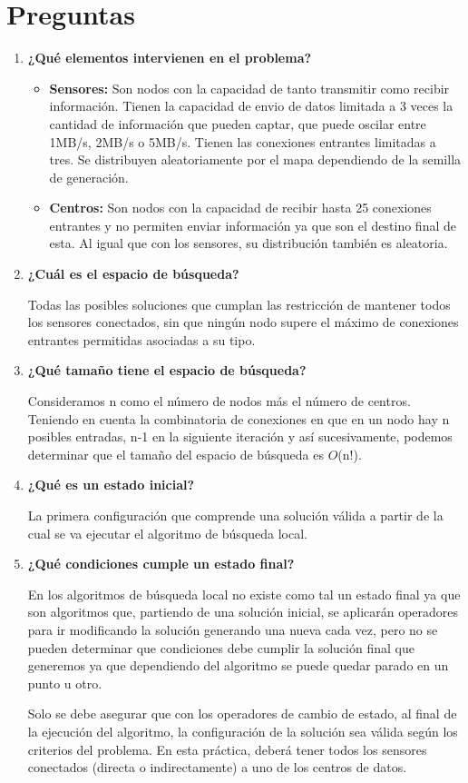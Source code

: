 \documentclass{article}
\begin{document}
\section{Preguntas}
\begin{enumerate}
  \item \textbf{¿Qué elementos intervienen en el problema?}
  \begin{itemize}
      \item \textbf{Sensores:} Son nodos con la capacidad de tanto transmitir como recibir información. Tienen la capacidad de envio de datos limitada a 3 veces la cantidad de información que pueden captar, que puede oscilar entre 1MB/s, 2MB/s o 5MB/s. Tienen las conexiones entrantes limitadas a tres. Se distribuyen aleatoriamente por el mapa dependiendo de la semilla de generación.
      \item \textbf{Centros:} Son nodos con la capacidad de recibir hasta 25 conexiones entrantes y no permiten enviar información ya que son el destino final de esta. Al igual que con los sensores, su distribución también es aleatoria.
  \end{itemize}
  \item \textbf{¿Cuál es el espacio de búsqueda?}\par
  Todas las posibles soluciones que cumplan las restricción de mantener todos los sensores conectados, sin que ningún nodo supere el máximo de conexiones entrantes permitidas asociadas a su tipo.
  \item \textbf{¿Qué tamaño tiene el espacio de búsqueda?}\par
  Consideramos n como el número de nodos más el número de centros. Teniendo en cuenta la combinatoria de conexiones en que en un nodo hay n posibles entradas, n-1 en la siguiente iteración y así sucesivamente, podemos determinar que el tamaño del espacio de búsqueda es $O$(n!).
  \item \textbf{¿Qué es un estado inicial?}\par
  La primera configuración que comprende una solución válida a partir de la cual se va ejecutar el algoritmo de búsqueda local.
  \item \textbf{¿Qué condiciones cumple un estado final?}\par
  En los algoritmos de búsqueda local no existe como tal un estado final ya que son algoritmos que, partiendo de una solución inicial, se aplicarán operadores para ir modificando la solución generando una nueva cada vez, pero no se pueden determinar que condiciones debe cumplir la solución final que generemos ya que dependiendo del algoritmo se puede quedar parado en un punto u otro.\par
  Solo se debe asegurar que con los operadores de cambio de estado, al final de la ejecución del algoritmo, la configuración de la solución sea válida según los criterios del problema. En esta práctica, deberá tener todos los sensores conectados (directa o indirectamente) a uno de los centros de datos.


\end{enumerate}
\end{document}
